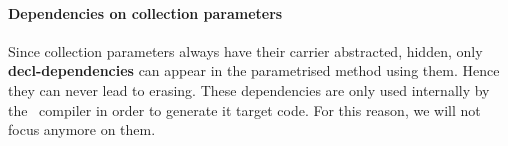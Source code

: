 \paragraph{Dependencies on collection parameters}
Since collection parameters always have their carrier abstracted,
hidden, only {\bf decl-dependencies} can appear in the parametrised
method using them. Hence they can never lead to erasing. These
dependencies are only used internally by the \focal\ compiler in order
to generate it target code. For this reason, we will not focus anymore
on them.

